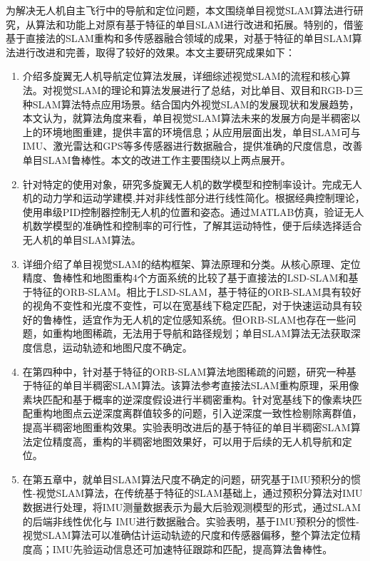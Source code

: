 


\begin{conclusion}
为解决无人机自主飞行中的导航和定位问题，本文围绕单目视觉SLAM算法进行研究，从算法和功能上对原有基于特征的单目SLAM进行改进和拓展。特别的，借鉴基于直接法的SLAM重构和多传感器融合领域的成果，对基于特征的单目SLAM算法进行改进和完善，取得了较好的效果。本文主要研究成果如下：
\begin{enumerate}  [label={(\arabic*)}]
\item 介绍多旋翼无人机导航定位算法发展，详细综述视觉SLAM的流程和核心算法。对视觉SLAM的理论和算法发展进行了总结，对比单目、双目和RGB-D三种SLAM算法特点应用场景。结合国内外视觉SLAM的发展现状和发展趋势，本文认为，就算法角度来看，单目视觉SLAM算法未来的发展方向是半稠密以上的环境地图重建，提供丰富的环境信息；从应用层面出发，单目SLAM可与IMU、激光雷达和GPS等多传感器进行数据融合，提供准确的尺度信息，改善单目SLAM鲁棒性。本文的改进工作主要围绕以上两点展开。
\item 针对特定的使用对象，研究多旋翼无人机的数学模型和控制率设计。完成无人机的动力学和运动学建模,并对非线性部分进行线性简化。根据经典控制理论，使用串级PID控制器控制无人机的位置和姿态。通过MATLAB仿真，验证无人机数学模型的准确性和控制率的可行性，了解其运动特性，便于后续选择适合无人机的单目SLAM算法。
\item 详细介绍了单目视觉SLAM的结构框架、算法原理和分类。从核心原理、定位精度、鲁棒性和地图重构4个方面系统的比较了基于直接法的LSD-SLAM和基于特征的ORB-SLAM。相比于LSD-SLAM，基于特征的ORB-SLAM具有较好的视角不变性和光度不变性，可以在宽基线下稳定匹配，对于快速运动具有较好的鲁棒性，适宜作为无人机的定位感知系统。但ORB-SLAM也存在一些问题，如重构地图稀疏，无法用于导航和路径规划；单目SLAM算法无法获取深度信息，运动轨迹和地图尺度不确定。
\item 在第四种中，针对基于特征的ORB-SLAM算法地图稀疏的问题，研究一种基于特征的单目半稠密SLAM算法。该算法参考直接法SLAM重构原理，采用像素块匹配和基于概率的逆深度假设进行半稠密重构。针对宽基线下的像素块匹配重构地图点云逆深度离群值较多的问题，引入逆深度一致性检剔除离群值，提高半稠密地图重构效果。实验表明改进后的基于特征的单目半稠密SLAM算法定位精度高，重构的半稠密地图效果好，可以用于后续的无人机导航和定位。
\item 在第五章中，就单目SLAM算法尺度不确定的问题，研究基于IMU预积分的惯性-视觉SLAM算法，在传统基于特征的SLAM基础上，通过预积分算法对IMU数据进行处理，将IMU测量数据表示为最大后验观测模型的形式，通过SLAM的后端非线性优化与
IMU进行数据融合。实验表明，基于IMU预积分的惯性-视觉SLAM算法可以准确估计运动轨迹的尺度和传感器偏移，整个算法定位精度高；IMU先验运动信息还可加速特征跟踪和匹配，提高算法鲁棒性。
\end{enumerate}


\end{conclusion}
